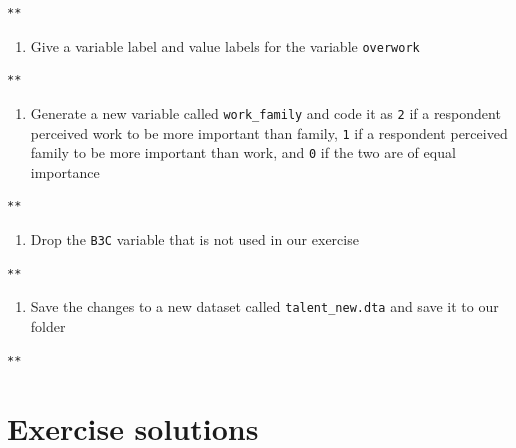 \documentclass[]{book}
\providecommand{\tightlist}{%
  \setlength{\itemsep}{0pt}\setlength{\parskip}{0pt}}
\begin{document}
\begin{verbatim}
**
\end{verbatim}

\begin{enumerate}
\def\labelenumi{\arabic{enumi}.}
\setcounter{enumi}{4}
\tightlist
\item
  Give a variable label and value labels for the variable \texttt{overwork}
\end{enumerate}

\begin{verbatim}
**
\end{verbatim}

\begin{enumerate}
\def\labelenumi{\arabic{enumi}.}
\setcounter{enumi}{5}
\tightlist
\item
  Generate a new variable called \texttt{work\_family} and code it as \texttt{2} if a respondent perceived work to be more important than family, \texttt{1} if a respondent perceived family to be more important than work, and \texttt{0} if the two are of equal importance
\end{enumerate}

\begin{verbatim}
**
\end{verbatim}

\begin{enumerate}
\def\labelenumi{\arabic{enumi}.}
\setcounter{enumi}{6}
\tightlist
\item
  Drop the \texttt{B3C} variable that is not used in our exercise
\end{enumerate}

\begin{verbatim}
**
\end{verbatim}

\begin{enumerate}
\def\labelenumi{\arabic{enumi}.}
\setcounter{enumi}{7}
\tightlist
\item
  Save the changes to a new dataset called \texttt{talent\_new.dta} and save it to our folder
\end{enumerate}

\begin{verbatim}
**
\end{verbatim}

\hypertarget{exercise-solutions}{%
\section{Exercise solutions}\label{exercise-solutions}}
\end{document}

